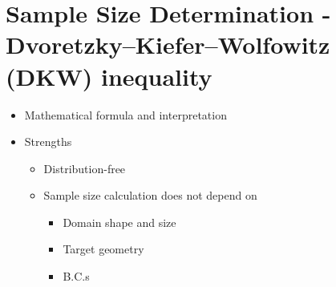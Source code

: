  \section{Sample Size Determination - Dvoretzky–Kiefer–Wolfowitz (DKW) inequality \cite{dvoretzky1956asymptotic}}\label{section:sample_size_determination}

 
 
      \begin{itemize}
        \item Mathematical formula and interpretation
        \item Strengths
          \begin{itemize}
            \item Distribution-free
            \item Sample size calculation does not depend on 
              \begin{itemize}
                \item Domain shape and size
                \item Target geometry
                \item B.C.s
              \end{itemize}
          \end{itemize}
      \end{itemize}
